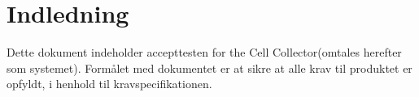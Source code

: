 \section{Indledning}
Dette dokument indeholder accepttesten for the Cell Collector(omtales herefter som systemet). Formålet med dokumentet er at sikre at alle krav til produktet er opfyldt, i henhold til kravspecifikationen.